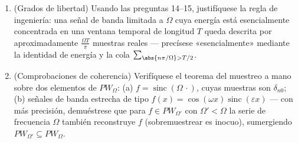 \begin{problem}[{Problema de fin de semana --- $\partial_tu =
\partial^2_{xx}u$, resuelta de principio a fin}]
\begin{enumerate}[resume]
        muestras: el efecto estroboscópico de la rueda de carro,
        matematizado. \item (Grados de libertad) Usando las preguntas
        14--15, justifíquese la regla de ingeniería: una señal de banda
        limitada a $\Omega$ cuya energía está esencialmente concentrada
        en una ventana temporal de longitud $T$ queda descrita por
        aproximadamente $\frac{\Omega T}\pi$ muestras reales ---
        precísese «esencialmente» mediante la identidad de energía y la
        cola $\sum_{\abs{n\pi/\Omega} >
        T/2}$. \item (Comprobaciones de coherencia) Verifíquese el
        teorema del muestreo a mano sobre dos elementos de $PW_\Omega$:
        (a) $f =
        \operatorname{sinc}(\Omega\,\cdot)$, cuyas muestras son
        $\delta_{n0}$; (b) señales de banda estrecha de tipo
        $f(x) = \cos(\omega x)
        \operatorname{sinc}(\varepsilon x)$ --- con más precisión,
        demuéstrese que para $f \in
        PW_{\Omega'}$ con $\Omega' < \Omega$ la serie de frecuencia
        $\Omega$ también reconstruye $f$ (sobremuestrear es inocuo),
        sumergiendo $PW_
        {\Omega'} \subseteq PW_\Omega$.
\end{enumerate}


\end{problem}
